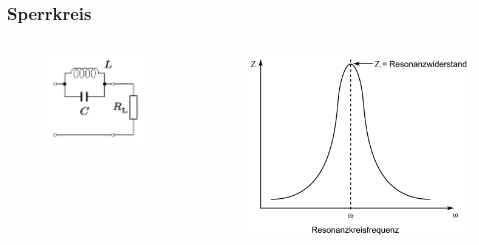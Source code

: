 \begin{frame}
  \frametitle{Sperrkreis}
  \begin{columns}
    \begin{center}
      \begin{figure}
        \includegraphics[width=\textwidth,height=.5\textheight,keepaspectratio]{e07/Sperrkreis.png}
      \end{figure}
    \end{center}
    \begin{center}
      \begin{figure}
        \includegraphics[width=\textwidth,height=.5\textheight,keepaspectratio]{e07/ParallelschwSig.png}

\end{figure}
\end{center}
\end{columns}
\end{frame}
